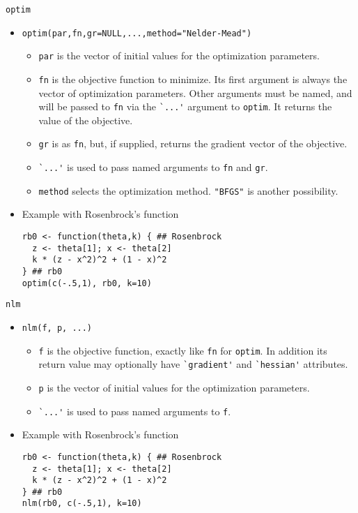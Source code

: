 \documentclass{beamer}
\begin{document}
\begin{frame}[fragile]{{\tt optim}}
\begin{itemize}
\item {\small \verb+optim(par,fn,gr=NULL,...,method="Nelder-Mead")+}
 \begin{itemize}
 \item {\tt par} is the vector of initial values for the optimization parameters.
 \item \verb+fn+ is the objective function to minimize. Its first argument is always the vector of optimization parameters. Other arguments must be named, and will be passed to {\tt fn} via the \verb+`...'+ argument to {\tt optim}. It returns the value of the objective.
 \item \verb+gr+ is as {\tt fn}, but, if supplied, returns the gradient vector of the objective.
 \item \verb+`...'+ is used to pass named arguments to {\tt  fn} and {\tt gr}. 
 \item {\tt method} selects the optimization method. \verb+"BFGS"+ is another possibility.
 \end{itemize}
\item Example with Rosenbrock's function
{\small \begin{verbatim}
rb0 <- function(theta,k) { ## Rosenbrock
  z <- theta[1]; x <- theta[2]
  k * (z - x^2)^2 + (1 - x)^2 
} ## rb0
optim(c(-.5,1), rb0, k=10)
\end{verbatim}}
\end{itemize}
\end{frame}

\begin{frame}[fragile]{{\tt nlm}}
\begin{itemize}
\item \verb+nlm(f, p, ...)+
 \begin{itemize}
 \item \verb+f+ is the objective function, exactly like {\tt fn} for {\tt optim}. In addition its return value may optionally have \verb+`gradient'+ and \verb+`hessian'+ attributes.
 \item {\tt p} is the vector of initial values for the optimization parameters.
 \item \verb+`...'+ is used to pass named arguments to {\tt  f}.  
\end{itemize}
\item Example with Rosenbrock's function
{\small \begin{verbatim}
rb0 <- function(theta,k) { ## Rosenbrock
  z <- theta[1]; x <- theta[2]
  k * (z - x^2)^2 + (1 - x)^2 
} ## rb0
nlm(rb0, c(-.5,1), k=10)
\end{verbatim}}\end{itemize}
\end{frame}
\end{document}
